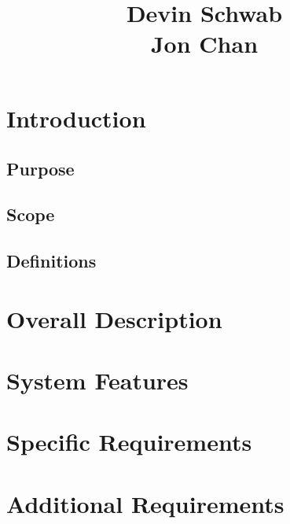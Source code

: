 \documentclass{article}
\title{\projName \\ \vspace{10 mm}
\docName \\\vspace{10 mm}
Devin Schwab\\
Jon Chan}
\date{\docDate}
\begin{document}
\maketitle

\newpage

\tableofcontents
\listoffigures

\newpage

\section{Introduction}
\subsection{Purpose}

\subsection{Scope}

\subsection{Definitions}

\section{Overall Description}

\section{System Features}

\section{Specific Requirements}

\section{Additional Requirements}
\end{document}
